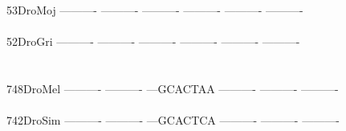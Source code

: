 \documentclass[11pt,twoside,reqno,a4paper]{article}
\begin{document}
{53\hspace*{3\charwidth}DroMoj	----------	----------	----------	----------	----------	----------	\\
\hspace*{5\charwidth}\hspace*{7\charwidth}\hspace*{1\charwidth}\hspace*{1\charwidth}\hspace*{1\charwidth}\hspace*{1\charwidth}\hspace*{1\charwidth}\hspace*{1\charwidth}\\
52\hspace*{3\charwidth}DroGri	----------	----------	----------	----------	----------	----------	\\
\hspace*{5\charwidth}\hspace*{7\charwidth}\hspace*{1\charwidth}\hspace*{1\charwidth}\hspace*{1\charwidth}\hspace*{1\charwidth}\hspace*{1\charwidth}\hspace*{1\charwidth}\\
\\
748\hspace*{2\charwidth}DroMel	----------	----------	---GCACTAA	----------	----------	----------	\\
\hspace*{5\charwidth}\hspace*{7\charwidth}\hspace*{1\charwidth}\hspace*{1\charwidth}\hspace*{1\charwidth}\hspace*{1\charwidth}\hspace*{1\charwidth}\hspace*{1\charwidth}\\
742\hspace*{2\charwidth}DroSim	----------	----------	---GCACTCA	----------	----------	----------	\\
\hspace*{5\charwidth}\hspace*{7\charwidth}\hspace*{1\charwidth}\hspace*{1\charwidth}\hspace*{1\charwidth}\hspace*{1\charwidth}\hspace*{1\charwidth}\hspace*{1\charwidth}\\
}
\end{document}
